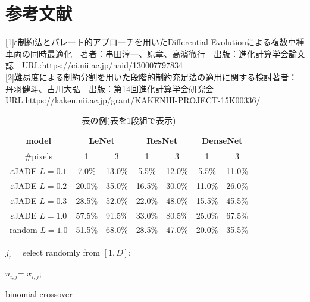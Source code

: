 \documentclass[twocolumn,10pt]{jarticle}
\begin{document}




\section{参考文献}
[1]ε制約法とパレート的アプローチを用いたDifferential Evolutionによる複数車種車両の同時最適化　著者：串田淳一、原章、高濱徹行　出版：進化計算学会論文誌　URL:https://ci.nii.ac.jp/naid/130007797834\\

[2]難易度による制約分割を用いた段階的制約充足法の適用に関する検討著者：丹羽健斗、古川大弘　出版：第14回進化計算学会研究会 URL:https://kaken.nii.ac.jp/grant/KAKENHI-PROJECT-15K00336/


\begin{table}[htbp]
\caption{表の例(表を1段組で表示)}
\label{results}
\begin{center}
\begin{tabular}{|c|c|c|c|c|c|c|} \hline
model & \multicolumn{2}{c|}{LeNet} & \multicolumn{2}{c|}{ResNet} & \multicolumn{2}{c|}{DenseNet} \\\hline
\#pixels & 1 & 3 & 1 & 3 & 1 & 3 \\\hline
$\varepsilon$JADE $L=0.1$ & 7.0\% & 13.0\% & 5.5\% & 12.0\% & 5.5\%& 11.0\% \\\hline
$\varepsilon$JADE $L=0.2$ & 20.0\% & 35.0\% & 16.5\% & 30.0\% & 11.0\% & 26.0\% \\\hline
$\varepsilon$JADE $L=0.3$ & 28.5\% & 52.0\% & 22.0\% & 48.0\% & 15.5\% & 45.5\% \\\hline
$\varepsilon$JADE $L=1.0$ & 57.5\% & 91.5\% & 33.0\% & 80.5\% & 25.0\% & 67.5\% \\\hline
\hline
random $L=1.0$ & 51.5\% & 68.0\% & 28.5\% & 47.0\% & 20.0\% & 35.5\% \\\hline

\end{tabular}
\end{center}
\end{table}


\begin{algorithm}[htbp]
\DontPrintSemicolon
  
$j_r=$select randomly from $[1,D]$;
 
 {

    {
    $u_{i,j}$=  $x_{i,j}$;
    }

}

\caption{binomial crossover}         
\label{Alg:bin}   
\end{algorithm}
\end{document}
